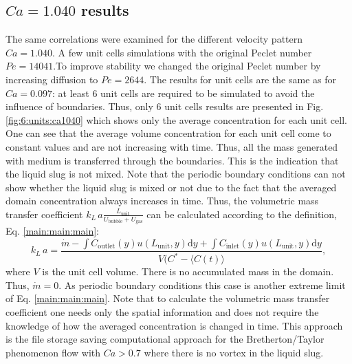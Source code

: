 \documentclass{article}
\newcommand{\beq}{\begin{equation}}
\newcommand{\feq}{\end{equation}}
\newcommand{\vol}{k_L\,a}
\newcommand{\lunit}{L_{\mathrm{unit}}}
\newcommand{\ububble}{U_{\mathrm{bubble}}}
\newcommand{\ugas}{U_{\mathrm{gas}}}
\newcommand{\cinlet}{C_{\mathrm{inlet}}}
\newcommand{\coutlet}{C_{\mathrm{outlet}}}
\newcommand{\cstar}{C^{*}}
\newcommand{\volnondim}{\vol \frac{\lunit}{\ububble+\ugas}}
\begin{document}
\subsection{$Ca=1.040$ results}
The same correlations were examined for the different velocity pattern $Ca=1.040$.%
A few unit cells simulations with the original Peclet number $Pe=14041$.To improve stability we changed the original Peclet number by
increasing
diffusion to $Pe=2644$. The results for unit cells are the same as for $Ca=0.097$:
at least $6$ unit cells are required to be simulated to avoid the influence of boundaries. Thus,
only $6$ unit cells results are presented in Fig. \ref{fig:6:units:ca1040} which shows only the
average concentration for each unit cell. One can see that the average volume concentration for each unit cell come to
constant values and are not increasing with time. Thus, all the
mass generated with medium is transferred through the boundaries. This is the indication that the
liquid slug is not mixed. Note that the periodic boundary conditions can not show whether the
liquid slug is mixed or not due to the fact that the averaged domain concentration always increases in time. 
Thus, the volumetric mass transfer coefficient $\volnondim$ can be calculated according to the
definition, Eq. \ref{main:main:main}:
\beq
\label{inlet:outlet:spatial:location}
\vol =
\frac{\dot{m}-\int{\coutlet(y)u(\lunit,y)\mathrm{d}y}+\int{\cinlet(y)u(\lunit,y)\mathrm{d}y}}{V
(\cstar - \langle C(t) \rangle},
\feq 
where $V$ is the unit cell volume. There is no accumulated mass in the domain. Thus, $\dot{m}=0$. As periodic boundary
conditions this case is another extreme limit of Eq. \ref{main:main:main}. Note that to calculate
the volumetric mass transfer coefficient one needs only the spatial information and does not
require the knowledge of how the averaged concentration is changed in time. This approach is the file storage saving computational approach for the Bretherton/Taylor phenomenon flow with $Ca>0.7$ where there is no vortex in the liquid slug. 
\end{document}
